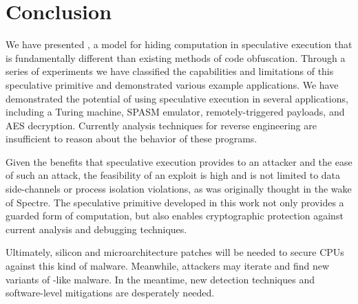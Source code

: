 
\section{Conclusion}

We have presented \speculake, a model for hiding computation in
speculative execution that is fundamentally different than existing methods of
code obfuscation. Through a series of experiments we have classified the
capabilities and limitations of this speculative primitive and demonstrated
various example applications. We have demonstrated the potential
of using speculative execution in several applications, including a Turing
machine, SPASM emulator, remotely-triggered payloads, and AES decryption.
Currently analysis techniques for reverse engineering are insufficient to reason
about the behavior of these programs.

Given the benefits that speculative execution provides to an attacker and the
ease of such an attack, the feasibility of an \speculake exploit is high and is
not limited to data side-channels or process isolation violations, as was
originally thought in the wake of Spectre. The speculative primitive developed
in this work not only provides a guarded form of computation, but also enables
cryptographic protection against current analysis and debugging techniques.

Ultimately, silicon and microarchitecture patches will be needed to secure CPUs
against this kind of malware. Meanwhile, attackers may
iterate and find new variants of \speculake-like malware.
In the meantime, new detection techniques and
software-level mitigations are desperately needed.

%
